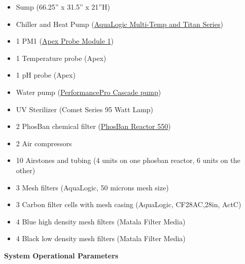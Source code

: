 \documentclass[]{book}
\providecommand{\tightlist}{%
  \setlength{\itemsep}{0pt}\setlength{\parskip}{0pt}}
\begin{document}
\begin{itemize}
\tightlist
\item
  Sump (66.25'' x 31.5'' x 21''H)\\
\item
  Chiller and Heat Pump
  (\href{https://github.com/SilbigerLab/Mesocosm_User_Manual/blob/master/Manuals/AquaLogic_Chiller.pdf}{AquaLogic
  Multi-Temp and Titan Series})\\
\item
  1 PM1
  (\href{https://github.com/SilbigerLab/Mesocosm_User_Manual/blob/master/Manuals/PM1_manual.pdf}{Apex
  Probe Module 1})\\
\item
  1 Temperature probe (Apex)\\
\item
  1 pH probe (Apex)
\item
  Water pump
  (\href{https://github.com/SilbigerLab/Mesocosm_User_Manual/blob/master/Manuals/Complete_Cascade.pdf}{PerformancePro
  Cascade pump})\\
\item
  UV Sterilizer (Comet Series 95 Watt Lamp)\\
\item
  2 PhosBan chemical filter
  (\href{https://github.com/SilbigerLab/Mesocosm_User_Manual/blob/master/Manuals/Phosban_Reactor.pdf}{PhosBan
  Reactor 550})\\
\item
  2 Air compressors\\
\item
  10 Airstones and tubing (4 units on one phosban reactor, 6 units on
  the other)\\
\item
  3 Mesh filters (AquaLogic, 50 microns mesh size)\\
\item
  3 Carbon filter cells with mesh casing (AquaLogic, CF28AC,28in,
  ActC)\\
\item
  4 Blue high density mesh filters (Matala Filter Media)\\
\item
  4 Black low density mesh filters (Matala Filter Media)
\end{itemize}

 \textbf{System Operational Parameters}
\end{document}

